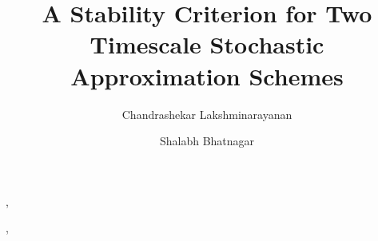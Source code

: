 \documentclass[preprint]{elsarticle}
\begin{document}
\title{A Stability Criterion for Two Timescale Stochastic Approximation Schemes}
\author{Chandrashekar Lakshminarayanan}
,    %
\author{Shalabh Bhatnagar}
,               %
\address{Department of Computer Science and Automation,\\ Indian Institute of Science,\\ Bangalore-560012,\\ India.}  %








\end{document}
